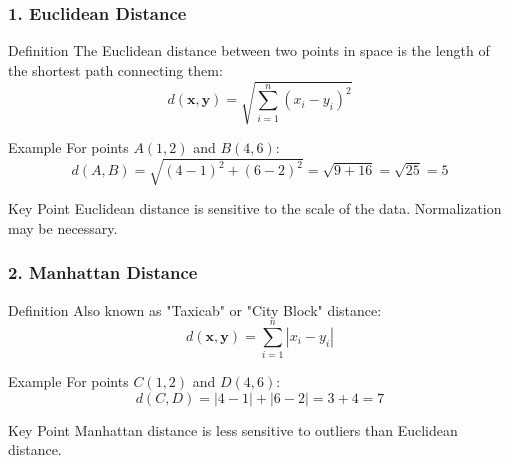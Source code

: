 \documentclass[aspectratio=169]{beamer}
\begin{document}
\begin{frame}[fragile]
    \frametitle{1. Euclidean Distance}
    
    \begin{block}{Definition}
        The Euclidean distance between two points in space is the length of the shortest path connecting them:
        \begin{equation}
        d(\mathbf{x}, \mathbf{y}) = \sqrt{\sum_{i=1}^{n} (x_i - y_i)^2}
        \end{equation}
    \end{block}
    
    \begin{block}{Example}
        For points \(A(1, 2)\) and \(B(4, 6)\):
        \begin{equation}
        d(A, B) = \sqrt{(4-1)^2 + (6-2)^2} = \sqrt{9 + 16} = \sqrt{25} = 5
        \end{equation}
    \end{block}
    
    \begin{block}{Key Point}
        Euclidean distance is sensitive to the scale of the data. Normalization may be necessary.
    \end{block}
\end{frame}

\begin{frame}[fragile]
    \frametitle{2. Manhattan Distance}
    
    \begin{block}{Definition}
        Also known as "Taxicab" or "City Block" distance:
        \begin{equation}
        d(\mathbf{x}, \mathbf{y}) = \sum_{i=1}^{n} |x_i - y_i|
        \end{equation}
    \end{block}
    
    \begin{block}{Example}
        For points \(C(1, 2)\) and \(D(4, 6)\):
        \begin{equation}
        d(C, D) = |4 - 1| + |6 - 2| = 3 + 4 = 7
        \end{equation}
    \end{block}
    
    \begin{block}{Key Point}
        Manhattan distance is less sensitive to outliers than Euclidean distance.
    \end{block}
\end{frame}
\end{document}
